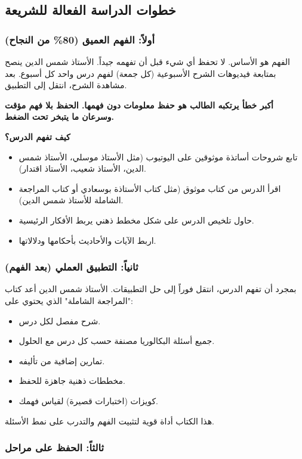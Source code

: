 \documentclass[12pt,a4paper]{book}
\newcommand{\importantAr}[1]{%
	\begin{important}
		\bfseries #1
	\end{important}
}
\begin{document}
	\subsection{خطوات الدراسة الفعالة للشريعة}
	
	\subsubsection{أولاً: الفهم العميق (80\% من النجاح)}
	
	الفهم هو الأساس. لا تحفظ أي شيء قبل أن تفهمه جيداً. الأستاذ شمس الدين ينصح بمتابعة فيديوهات الشرح الأسبوعية (كل جمعة) لفهم درس واحد كل أسبوع. بعد مشاهدة الشرح، انتقل إلى التطبيق.
	
	\importantAr{أكبر خطأ يرتكبه الطالب هو حفظ معلومات دون فهمها. الحفظ بلا فهم مؤقت وسرعان ما يتبخر تحت الضغط.}
	
	\textbf{كيف تفهم الدرس؟}
	\begin{itemize}
		\item تابع شروحات أساتذة موثوقين على اليوتيوب (مثل الأستاذ موسلي، الأستاذ شمس الدين، الأستاذ شعيب، الأستاذ اقتدار).
		\item اقرأ الدرس من كتاب موثوق (مثل كتاب الأستاذة بوسعادي أو كتاب المراجعة الشاملة للأستاذ شمس الدين).
		\item حاول تلخيص الدرس على شكل مخطط ذهني يربط الأفكار الرئيسية.
		\item اربط الآيات والأحاديث بأحكامها ودلالاتها.
	\end{itemize}
	
	\subsubsection{ثانياً: التطبيق العملي (بعد الفهم)}
	
	بمجرد أن تفهم الدرس، انتقل فوراً إلى حل التطبيقات. الأستاذ شمس الدين أعد كتاب "المراجعة الشاملة" الذي يحتوي على:
	\begin{itemize}
		\item شرح مفصل لكل درس.
		\item جميع أسئلة البكالوريا مصنفة حسب كل درس مع الحلول.
		\item تمارين إضافية من تأليفه.
		\item مخططات ذهنية جاهزة للحفظ.
		\item كويزات (اختبارات قصيرة) لقياس فهمك.
	\end{itemize}
	
	هذا الكتاب أداة قوية لتثبيت الفهم والتدرب على نمط الأسئلة.
	
	\subsubsection{ثالثاً: الحفظ على مراحل}
	
\end{document}

